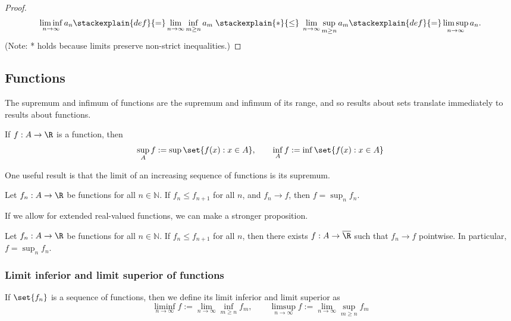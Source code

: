 \documentclass{article} %
\begin{document}
\begin{proof}
\[\liminf_{n \to \infty} a_n  \stackexplain{def}{=} \lim_{n \to \infty} \inf_{m \geq n} a_m \; \stackexplain{*}{\leq} \;  \lim_{n \to \infty} \sup_{m \geq n} a_m \stackexplain{def}{=}  \limsup_{n \to \infty} a_n. \]
{\tiny (Note: * holds because limits preserve non-strict inequalities.)}	
\end{proof}

\subsection{Functions}

The supremum and infimum of functions are the supremum and infimum of its range, and so results about sets translate immediately to results about functions.

\begin{definition}
If $f : A \to \R$ is a function, then 
\[ \sup_A f := \sup \set{f(x) : x \in A}, \quad \quad \inf_A f := \inf \set{f(x) : x \in A} \]	
\end{definition}

One useful result is that the limit of an increasing sequence of functions is its supremum.

\begin{proposition}
Let $f_n : A \to \R$ be functions for all $n \in \mathbb{N}$. If $f_n \leq f_{n+1}$ for all $n$, and $f_n \to f$, then $f = \sup_n f_n$.
\label{prop:limit_of_an_increasing_sequence_of_functions_is_its_supremum}	
\end{proposition}

If we allow for extended real-valued functions, we can make a stronger proposition.
\begin{proposition}
Let $f_n : A \to \R$ be functions for all $n \in \mathbb{N}$. If $f_n \leq f_{n+1}$ for all $n$, then there exists $f: A \to \overline{\R}$ such that  $f_n \to f$ pointwise. In particular, $f=\sup_n f_n$.
\label{prop:limit_of_an_increasing_sequence_of_functions_exists_and_is_the_supremum_if_we_allow_functions_to_map_to_the_extended_reals}	
\end{proposition}



\subsubsection{Limit inferior and limit superior of functions}

\begin{definition}
If $\set{f_n}$ is a sequence of functions, then  we define its limit inferior and limit superior as 
\[ \liminf_{n \to \infty} f := \lim_{n \to \infty} \inf_{m \geq n} f_m, \quad \quad \limsup_{n \to \infty} f := \lim_{n \to \infty} \sup_{m \geq n} f_m \]	
\end{definition}
\end{document}
